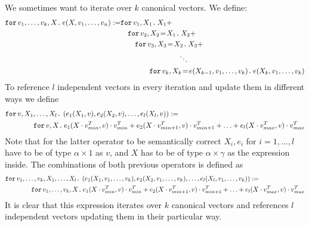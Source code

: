 We sometimes want to iterate over $k$ canonical vectors. We define:
\begin{align*}
  \ffor{v_1,\ldots, v_k}{X}{e(X,v_1,\ldots, v_n)}:= &\ffor{v_1}{X_1}{X_1 +} \\
  &\hspace{1em}\initf{X_1}{v_2}{X_2}{X_2 + } \\
  &\hspace{2em}\initf{X_2}{v_3}{X_3}{X_3 + } \\
  &\hspace{8em}\ddots \\
  &\hspace{4em}\initf{e(X_{k-1},v_1,\ldots, v_k)}{v_k}{X_k}{ e(X_k,v_1,\ldots, v_k)}
\end{align*}
To reference $l$ independent vectors in every iteration and update them in different ways we define
\begin{align*}
&\ffor{v}{X_1,\ldots, X_l}{\left( e_1(X_1,v), e_2(X_2,v), \ldots, e_l(X_l,v) \right)} :=\\
&\hspace{4em}\ffor{v}{X}{e_1(X\cdot v_{min}^T,v)\cdot v_{min}^T + e_2(X\cdot v_{min+1}^T,v)\cdot v_{min+1}^T + \ldots + e_l(X\cdot v_{max}^T,v)\cdot v_{max}^T}
\end{align*}
Note that for the latter operator to be semantically correct $X_i,e_i$ for $ i=1,\ldots,l$ have to be of type $\alpha\times 1$ as $v$, and $X$ has to be of type $\alpha\times\gamma$ as the expression inside.
The combinations of both previous operators is defined as
\begin{align*}
&\ffor{v_1,\ldots, v_k}{X_1,\ldots, X_l}{\left( e_1(X_1,v_1,\ldots, v_k), e_2(X_2,v_1,\ldots, v_k), \ldots, e_l(X_l,v_1,\ldots, v_k) \right)} :=\\
&\hspace{4em}\ffor{v_1,\ldots, v_k}{X}{e_1(X\cdot v_{min}^T,v)\cdot v_{min}^T + e_2(X\cdot v_{min+1}^T,v)\cdot v_{min+1}^T + \ldots + e_l(X\cdot v_{max}^T,v)\cdot v_{max}^T}
\end{align*}
It is clear that this expression iterates over $k$ canonical vectors and references $l$ independent vectors updating them in their particular way.